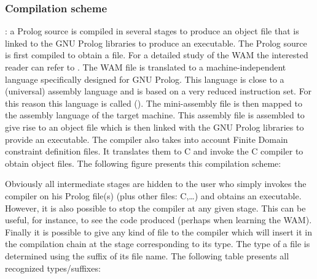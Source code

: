 \subsubsection{Compilation scheme}
\label{Compilation-scheme}
: a Prolog source is compiled in several
stages to produce an object file that is linked to the GNU Prolog libraries
to produce an executable. The Prolog source is first compiled to obtain a
 \cite{Warren83} file. For a detailed study of the WAM the
interested reader can refer to
 \cite{Ait-Kaci91}. The WAM file is
translated to a machine-independent language specifically designed for GNU
Prolog. This language is close to a (universal) assembly language and is
based on a very reduced instruction set. For this reason this language is
called  (). The mini-assembly file is then
mapped to the assembly language of the target machine. This assembly file is
assembled to give rise to an object file which is then linked with the GNU
Prolog libraries to provide an executable.  The compiler also takes into
account Finite Domain constraint definition files. It translates them to C
and invoke the C compiler to obtain object files. The following figure
presents this compilation scheme:


Obviously all intermediate stages are hidden to the user who simply invokes
the compiler on his Prolog file(s) (plus other files: C,\ldots) and
obtains an executable. However, it is also possible to stop the compiler at
any given stage. This can be useful, for instance, to see the  code
produced (perhaps when learning the WAM). Finally it is possible to give any
kind of file to the compiler which will insert it in the compilation chain
at the stage corresponding to its type. The type of a file is determined
using the suffix of its file name. The following table presents all
recognized types/suffixes:


